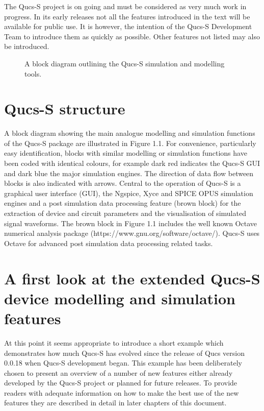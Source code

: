 \noindent The Qucs-S project is on going and must be considered as very much work in progress. In its early releases not all the features introduced in the text will be available for public use. It is however, the intention of the Qucs-S Development Team to introduce them as quickly as possible. Other features not listed may also be introduced.


\begin{figure}[h]
	\centering
	\caption{A block diagram outlining the Qucs-S simulation and modelling tools.}
	\label{FigCH1-1}
\end{figure}

\section{Qucs-S structure}
A block diagram showing the main analogue modelling and simulation functions of the Qucs-S package are illustrated in Figure 1.1.  For convenience, particularly easy identification, blocks with  similar modelling or simulation functions have been coded with identical colours, for example dark red indicates the Qucs-S GUI and dark blue the major simulation engines. The direction of data flow between blocks is also indicated with arrows. Central to the operation of Qucs-S is a graphical user interface (GUI), the Ngspice, Xyce and SPICE OPUS simulation engines and a post simulation data processing feature (brown block) for the extraction of device and circuit parameters and the visualisation of simulated signal waveforms. The brown block in Figure 1.1 includes the well known Octave numerical analysis package (https://www.gnu.org/software/octave/). Qucs-S uses Octave for advanced post simulation data processing related tasks.

\section{A first look at the extended Qucs-S device modelling and simulation features}
At this point it seems appropriate to introduce a short example which demonstrates how much Qucs-S has evolved since the release of Qucs version 0.0.18 when Qucs-S development began. This example has been deliberately chosen to present an overview of a number of new features either already developed by the Qucs-S project or planned for future releases. To provide readers with adequate information on how to make the best use of the new features they are described in detail in later chapters of this document.

